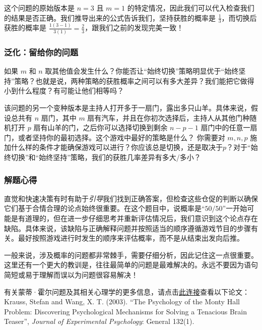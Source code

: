 这个问题的原始版本是 $n = 3$ 且 $m = 1$ 的特定情况，因此我们可以代入检查我们的结果是否正确。我们推导出来的公式告诉我们，坚持获胜的概率是 $\frac{1}{3}$，而切换后获胜的概率是 $\frac{1(3-1)}{3(1)} = \frac{2}{3}$，跟我们之前的发现完美一致！

\subsubsection*{泛化：留给你的问题}

如果 $m$ 和 $n$ 取其他值会发生什么？你能否让``始终切换''策略明显优于``始终坚持''策略？也就是说，两种策略的获胜概率之间可以有多大差异？我们能把它做得小到什么程度？有可能让他们相等吗？

该问题的另一个变种版本是主持人打开多于一扇门，露出多只山羊。具体来说，假设总共有 $n$ 扇门，其中 $m$ 扇有汽车，并且在你初次选择后，主持人从其他门种随机打开 $p$ 扇有山羊的门，之后你可以选择切换到剩余 $n-p-1$ 扇门中的任意一扇门，或者坚持你的最初选择。这个游戏中最好的策略是什么？ 你需要对 $m,n,p$ 施加什么样的条件才能确保游戏可以进行？你应该总是切换，还是取决于$p$？对于``始终切换''和``始终坚持''策略，我们的获胜几率差异有多大/多小？

\subsubsection*{解题心得}

直觉和快速决策有时有助于\emph{引导}我们找到正确答案，但检查这些仓促的判断以确保它们基于合情合理的论点始终很重要。在这个题目中，说概率是``$50/50$''一开始可能是有道理的，但在进一步仔细思考并重新评估情况后，我们意识到这个论点存在缺陷。具体来说，该缺陷与正确解释问题并按照适当的顺序遵循游戏节目的步骤有关。最好按照游戏进行时发生的顺序来评估概率，而不是从结束出发向后推。

一般来说，涉及概率的问题都非常棘手，需要仔细分析，因此记住这一点很重要。这里还有一个更大的教训是，往往最简单的问题是最难解决的。永远不要因为语句简短或易于理解而误以为问题很容易解决！

有关蒙蒂·霍尔问题及其相关心理学的更多信息，请点击\href{http://www.usd.edu/~xtwang/Papers/MontyHallPaper.pdf}{此连接}查看以下论文： Krauss, Stefan and Wang, X. T. (2003). ``The Psychology of the Monty Hall Problem: Discovering Psychological Mechanisms for Solving a Tenacious Brain Teaser'', \emph{Journal of Experimental Psychology}: General 132(1).